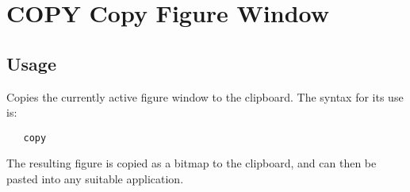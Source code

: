 \section{COPY Copy Figure Window}

\subsection{Usage}

Copies the currently active figure window to the clipboard.
The syntax for its use is:
\begin{verbatim}
   copy
\end{verbatim}
The resulting figure is copied as a bitmap to the clipboard, 
and can then be pasted into any suitable application.
